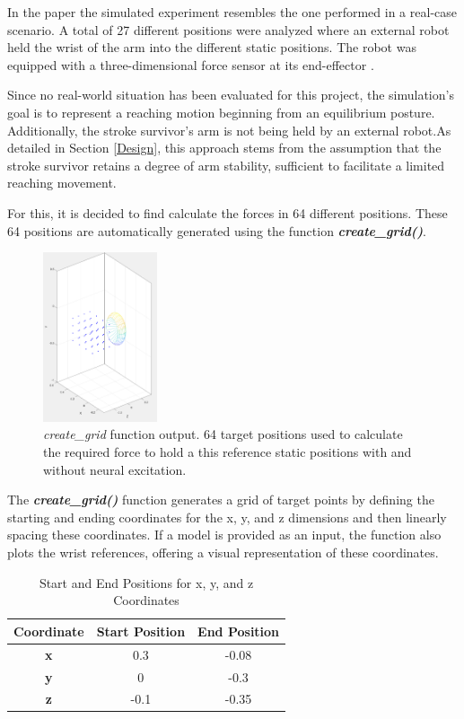  In the paper \cite{QSC} the simulated experiment resembles the one performed in a real-case scenario. A total of 27 different positions were analyzed where an external robot held the wrist of the arm into the different static positions. The robot was equipped with a three-dimensional force sensor at its end-effector \cite{HSAC}. 
 
 Since no real-world situation has been evaluated for this project, the simulation's goal is to represent a reaching motion beginning from an equilibrium posture. Additionally, the stroke survivor's arm is not being held by an external robot.As detailed in Section \ref{Design}, this approach stems from the assumption that the stroke survivor retains a degree of arm stability, sufficient to facilitate a limited reaching movement.  

 For this, it is decided to find calculate the forces in 64 different positions. These 64 positions are automatically generated using the function \textit{\textbf{create\_grid()}}.
 
\begin{figure}[h!]
    \centering
    \includegraphics[width=0.3\textwidth]{Pictures/Model/create_grid.png}
    \caption{\textit{create\_grid} function output. 64 target positions used to calculate the required force to hold a this reference static positions with and without neural excitation.}
    \label{fig:create_grid}
\end{figure}

The \textbf{\textit{create\_grid()}} function generates a grid of target points by defining the starting and ending coordinates for the x, y, and z dimensions and then linearly spacing these coordinates. If a model is provided as an input, the function also plots the wrist references, offering a visual representation of these coordinates.

\begin{table}[h]
    \centering
    \caption{Start and End Positions for x, y, and z Coordinates}
    \tiny
    \begin{tabular}{|c|c|c|}
        \hline
        \textbf{Coordinate} & Start Position & End Position \\
        \hline
        \textbf{x} & 0.3 & -0.08 \\
        \textbf{y} & 0 & -0.3 \\
        \textbf{z} & -0.1 & -0.35 \\
        \hline
    \end{tabular}
    \label{table:coordinates}
\end{table}



